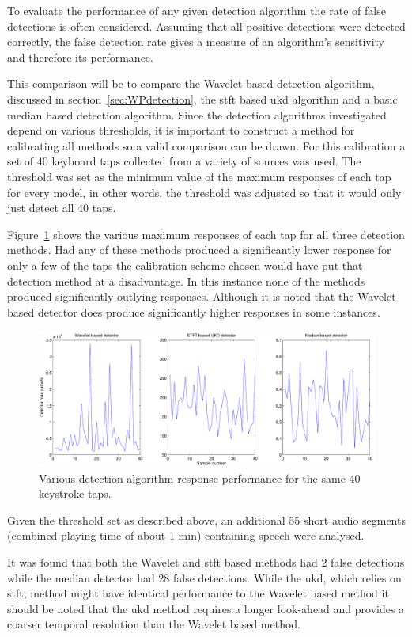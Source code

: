 To evaluate the performance of any given detection algorithm the rate of false detections is often considered. Assuming that all positive detections were detected correctly, the false detection rate gives a measure of an algorithm's sensitivity and therefore its performance.

This comparison will be to compare the Wavelet based detection algorithm, discussed in section~\ref{sec:WPdetection}, the \gls{stft} based \gls{ukd} algorithm \cite{Subramanya2007} and a basic median based detection algorithm. Since the detection algorithms investigated depend on various thresholds, it is important to construct a method for calibrating all methods so a valid comparison can be drawn. For this calibration a set of 40 keyboard taps collected from a variety of sources was used. The threshold was set as the minimum value of the maximum responses of each tap for every model, in other words, the threshold was adjusted so that it would only just detect all 40 taps.

Figure~\ref{fig:maxes.pdf} shows the various maximum responses of each tap for all three detection methods. Had any of these methods produced a significantly lower response for only a few of the taps the calibration scheme chosen would have put that detection method at a disadvantage. In this instance none of the methods produced significantly outlying responses. Although it is noted that the Wavelet based detector does produce significantly higher responses in some instances.

\begin{figure} %
\centering
\includegraphics[width=120mm]{maxes.pdf}
\caption{Various detection algorithm response performance for the same 40 keystroke taps.}
\label{fig:maxes.pdf}
\end{figure}

Given the threshold set as described above, an additional 55 short audio segments (combined playing time of about 1 min) containing speech were analysed.

It was found that both the Wavelet and \gls{stft} based methods had 2 false detections while the median detector had 28 false detections. While the \gls{ukd}, which relies on \gls{stft}, method might have identical performance to the Wavelet based method it should be noted that the \gls{ukd} method requires a longer look-ahead and provides a coarser temporal resolution than the Wavelet based method.


